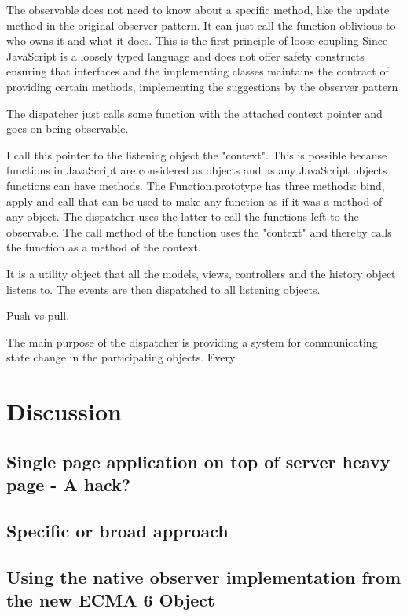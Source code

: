 \documentclass[english]{ifimaster}
\begin{document}
The observable does not need to know about a specific method, like the update method in the original observer pattern. It can just call the function oblivious to who owns it and what it does. This is the first principle of loose coupling%
Since JavaScript is a loosely typed language and does not offer safety constructs ensuring that interfaces and the implementing classes maintains the contract of providing certain methods, implementing the suggestions by the observer pattern  

The dispatcher just calls some function with the attached context pointer and goes on being observable. 

 I call this pointer to the listening object the "context". This is possible because functions in JavaScript are considered as objects and as any JavaScript objects functions can have methods.
The Function.prototype has three methods: bind, apply and call that can be used to make any function as if it was a method of any object. The dispatcher uses the latter to call the functions left to the observable. The call method of the function uses the "context" and thereby calls the function as a method of the context.

It is a utility object that all the models, views, controllers and the history object listens to. The events are then dispatched to all listening objects. 

Push vs pull.

The main purpose of the dispatcher is providing a system for communicating state change in the participating objects. Every 


\chapter{Discussion}
\section{Single page application on top of server heavy page - A hack?}
\section{Specific or broad approach}
\section{Using the native observer implementation from the new ECMA 6 Object}
\end{document}
